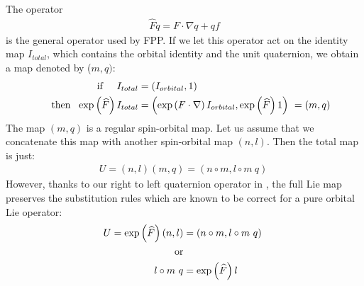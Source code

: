\documentclass[english,12pt,article]{article} %
\begin{document}
{{{The operator 
%
\begin{align} \widehat{F}q=
F\cdot \nabla q+qf \label{hop1}\end{align}
%
%
is the general operator used by FPP.   If we let this operator act on the identity map $I_{total}$, which contains the orbital identity and the unit quaternion,  we obtain a map denoted by ($m,q)$:
%
\begin{align} {\rm i}{\rm f}~~~~{I}_{total}&=\left({{I}_{orbital},1}\right)\nonumber \\
~~~~~{\rm t}{\rm h}{\rm e}{\rm n}~~\exp\left({\widehat{F}}\right){I}_{total}&=\left({\exp\left({F\cdot \nabla }\right){I}_{orbital},\exp\left({\widehat{F}}\right)1}\right)\ =
 \left({m,q}\right)\ \label{eq:ko}\end{align}
The map $ \left({m,q}\right)$ is a regular spin-orbital map.  Let us assume that we concatenate this map with another spin-orbital map $ \left({n,l}\right)$. Then the total map is just:
%
\begin{align} U=\left({n,l}\right)\left({m,q}\right)=
\left({n\circ m,l\circ m\ q}\right)\ \label{eq:con}\end{align}
%
However, thanks to our right to left quaternion operator in , the full Lie map preserves the substitution rules which are known to be correct for a pure orbital Lie operator:
%
\begin{align} U=\exp\left({\widehat{F}}\right)\left({n,l}\right)&=\left({n\circ m,l\circ m\ q}\right)\ \nonumber \\
~{\rm o}{\rm r}&\nonumber \\
 ~~l\circ m\ q&=\exp\left({\widehat{F}}\right)l\ \ \label{eq:conq}\end{align}

}}}
\end{document}
